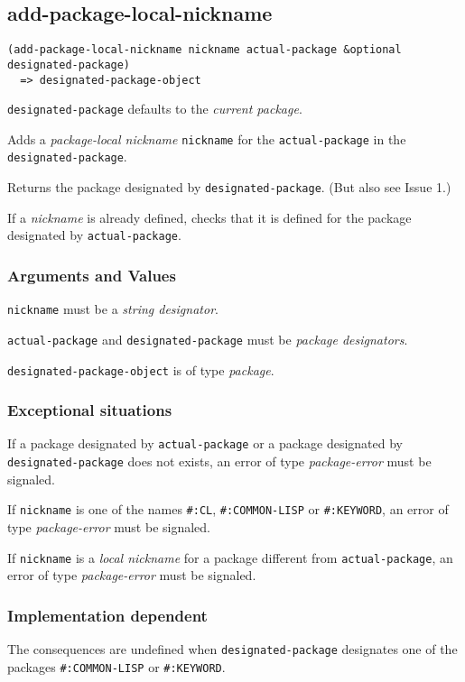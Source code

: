 \documentclass[11pt]{article}
\begin{document}
\subsection{add-package-local-nickname}
\label{sec:orgea59d89}
\begin{verbatim}
(add-package-local-nickname nickname actual-package &optional designated-package)
  => designated-package-object
\end{verbatim}

\texttt{designated-package} defaults to the \emph{current package}.

Adds a \emph{package-local nickname} \texttt{nickname} for the \texttt{actual-package} in the
\texttt{designated-package}.

Returns the package designated by \texttt{designated-package}. (But also see Issue 1.)

If a \emph{nickname} is already defined, checks that it is defined for the package
designated by \texttt{actual-package}.
\subsubsection{Arguments and Values}
\label{sec:orgdab3578}
\texttt{nickname} must be a \emph{string designator}.

\texttt{actual-package} and \texttt{designated-package} must be \emph{package designators}.

\texttt{designated-package-object} is of type \emph{package}.
\subsubsection{Exceptional situations}
\label{sec:org22e3196}
If a package designated by \texttt{actual-package} or a package designated by
\texttt{designated-package} does not exists, an error of type \emph{package-error}
must be signaled.

If \texttt{nickname} is one of the names \texttt{\#:CL}, \texttt{\#:COMMON-LISP} or \texttt{\#:KEYWORD},
an error of type \emph{package-error} must be signaled.

If \texttt{nickname} is a \emph{local nickname} for a package different from
\texttt{actual-package}, an error of type \emph{package-error} must be signaled.
\subsubsection{Implementation dependent}
\label{sec:orgabbe338}
The consequences are undefined when \texttt{designated-package} designates one of the
packages \texttt{\#:COMMON-LISP} or \texttt{\#:KEYWORD}.
\end{document}
